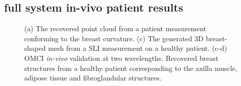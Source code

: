 \subsection{full system in-vivo patient results}
\begin{figure}[]
    \begin{center}
    \end{center}
    \caption{(a) The recovered point cloud from a patient measurement conforming to the breast curvature. (c) The generated 3D breast-shaped mesh from a SLI measurement on a healthy patient. (c-d) OMCI \textit{in-vivo} validation at two wavelengths. Recovered breast structures from a healthy patient corresponding to the axilla muscle, adipose tissue and fibroglandular structures.} 
    \label{fig:PatientResults}
\end{figure} 

